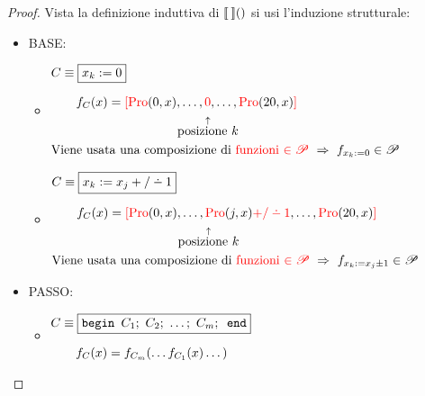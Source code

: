 \begin{proof}
    Vista la definizione induttiva di $\opsemWHILE{}{}$ si usi l'induzione
    strutturale:
    \begin{itemize}
        \item BASE:
            \begin{itemize}
                \renewcommand{\labelitemii}{\raisebox{5.2\height}{$-$}}
                \item $\begin{aligned}
                    &C\equiv \boxed{x_k:=0} \\[.6em]
                    &\hspace{2em}f_C(x) = {\color{red}[}
                    {\color{red}\Pro}(0,x),\dots,{\color{red}0},\dots,{\color{red}\Pro}
                    (20,x){\color{red}]}\\
                    &\hspace{10.05em}\overset{\uparrow}{\text{posizione $k$}}\\
                    & \text{Viene usata una composizione di {\color{red}funzioni 
                        $\in\ricPar$}}
                        \ \Rightarrow \ f_{x_k:=0}\in\ricPar
                \end{aligned}$
                \renewcommand{\labelitemii}{\raisebox{5.2\height}{$-$}}
                \item $\begin{aligned}
                    &C\equiv \boxed{x_k:=x_j+/\dotminus 1}\\[.6em]
                    &\hspace{2em}f_C(x) = {\color{red}[}
                    {\color{red}\Pro}(0,x),\dots,
                    {\color{red}\Pro}(j,x){\color{red}+/\dotminus 1}
                    ,\dots,{\color{red}\Pro}
                    (20,x){\color{red}]}\\
                    &\hspace{10.05em}\overset{\uparrow}{\text{posizione $k$}}\\
                    & \text{Viene usata una composizione di {\color{red}funzioni 
                        $\in\ricPar$}}
                        \ \Rightarrow \ f_{x_k:=x_j\pm1}\in\ricPar
                \end{aligned}$
            \end{itemize}
        \item PASSO:
            \begin{itemize}
                \renewcommand{\labelitemii}{\raisebox{2.1\height}{$-$}}
                \item $\begin{aligned}
                    &C\equiv \boxed{
                        \texttt{begin } C_ 1; \ C_2; \ \dots; \ C_m; \texttt{ end}
                    }\\[.6em]
                    &\hspace{2em}f_C(x) = f_{C_m}(\dots f_{C_1}(x)\dots)\\
                \end{aligned}$
                \vspace{.7em}


\end{itemize}
\end{itemize}
\end{proof}
